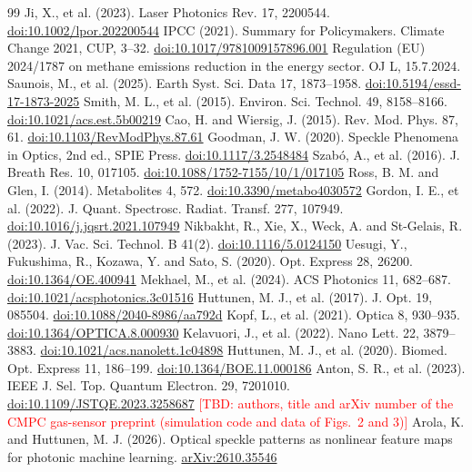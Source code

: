 \documentclass[a4paper,12pt]{article}
\newcommand{\tbd}[1]{\textcolor{red}{[TBD: #1]}}
\newcommand{\doilink}[1]{\href{https://doi.org/#1}{doi:#1}} %
\newcommand{\fc}[1]{\textcolor{dkindigo}{#1}} %
\newcommand{\nc}[1]{\textcolor{dkleaf}{#1}} %
\begin{document}
\begin{thebibliography}{99}
 Ji, X., et al. (2023). Laser Photonics Rev. 17, 2200544. \doilink{10.1002/lpor.202200544}
 \nc{IPCC (2021). Summary for Policymakers. Climate Change 2021, CUP, 3--32. \doilink{10.1017/9781009157896.001}}
 \nc{Regulation (EU) 2024/1787 on methane emissions reduction in the energy sector. OJ L, 15.7.2024.}
 \nc{Saunois, M., et al. (2025). Earth Syst. Sci. Data 17, 1873--1958. \doilink{10.5194/essd-17-1873-2025}}
 \nc{Smith, M. L., et al. (2015). Environ. Sci. Technol. 49, 8158--8166. \doilink{10.1021/acs.est.5b00219}}
 Cao, H. and Wiersig, J. (2015). Rev. Mod. Phys. 87, 61. \doilink{10.1103/RevModPhys.87.61}
 Goodman, J. W. (2020). Speckle Phenomena in Optics, 2nd ed., SPIE Press. \doilink{10.1117/3.2548484}
 Szab\'o, A., et al. (2016). J. Breath Res. 10, 017105. \doilink{10.1088/1752-7155/10/1/017105}
 Ross, B. M. and Glen, I. (2014). Metabolites 4, 572. \doilink{10.3390/metabo4030572}
 Gordon, I. E., et al. (2022). J. Quant. Spectrosc. Radiat. Transf. 277, 107949. \doilink{10.1016/j.jqsrt.2021.107949}
 Nikbakht, R., Xie, X., Weck, A. and St-Gelais, R. (2023). J. Vac. Sci. Technol. B 41(2). \doilink{10.1116/5.0124150}
 Uesugi, Y., Fukushima, R., Kozawa, Y. and Sato, S. (2020). Opt. Express 28, 26200. \doilink{10.1364/OE.400941}
 Mekhael, M., et al. (2024). ACS Photonics 11, 682--687. \doilink{10.1021/acsphotonics.3c01516}
 Huttunen, M. J., et al. (2017). J. Opt. 19, 085504. \doilink{10.1088/2040-8986/aa792d}
 Kopf, L., et al. (2021). Optica 8, 930--935. \doilink{10.1364/OPTICA.8.000930}
 Kelavuori, J., et al. (2022). Nano Lett. 22, 3879--3883. \doilink{10.1021/acs.nanolett.1c04898}
 Huttunen, M. J., et al. (2020). Biomed. Opt. Express 11, 186--199. \doilink{10.1364/BOE.11.000186}
 Anton, S. R., et al. (2023). IEEE J. Sel. Top. Quantum Electron. 29, 7201010. \doilink{10.1109/JSTQE.2023.3258687}
 \fc{\tbd{authors, title and arXiv number of the CMPC gas-sensor preprint (simulation code and data of Figs.~2 and 3)}}
 Arola, K. and Huttunen, M. J. (2026). Optical speckle patterns as nonlinear feature maps for photonic machine learning. \href{https://arxiv.org/abs/2610.35546}{arXiv:2610.35546}

\end{thebibliography}

\label{lastpage}
\end{document}
